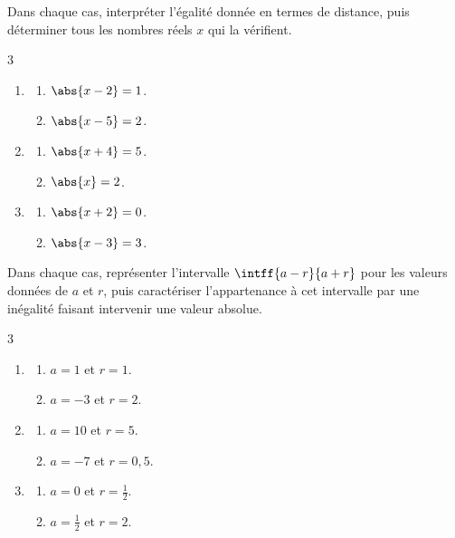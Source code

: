 \exo

Dans chaque cas, interpréter l'égalité donnée en termes de distance, puis déterminer tous les nombres réels $x$ qui la vérifient.

\vspace{-6pt}
\setlength{\columnsep}{1cm}
\setlength{\columnseprule}{0pt}
\begin{multicols}{3}
\begin{enumerate}
\item 
\begin{enumerate}
\item $\abs{x-2}=1$.

\medskip
\item $\abs{x-5}=2$.
\end{enumerate}
\item 
\begin{enumerate}
\item $\abs{x+4}=5$.

\medskip
\item $\abs{x}=2$.
\end{enumerate}
\item 
\begin{enumerate}
\item $\abs{x+2}=0$.

\medskip
\item $\abs{x-3}=3$.
\end{enumerate}
\end{enumerate}
\end{multicols}

\exo

Dans chaque cas, représenter l'intervalle $\intff{a-r}{a+r}$ pour les valeurs données de $a$ et $r$, puis caractériser l'appartenance à cet intervalle par une inégalité faisant intervenir une valeur absolue.

\vspace{-6pt}
\setlength{\columnsep}{1cm}
\setlength{\columnseprule}{0pt}
\begin{multicols}{3}
\begin{enumerate}
\item 
\begin{enumerate}
\item $a=1$ et $r=1$.

\medskip
\item $a=-3$ et $r=2$.
\end{enumerate}
\item 
\begin{enumerate}
\item $a=10$ et $r=5$.

\medskip
\item $a=-7$ et $r=0,5$.
\end{enumerate}
\item 
\begin{enumerate}
\item $a=0$ et $r=\frac{1}{2}$.

\medskip
\item $a=\frac{1}{2}$ et $r=2$.
\end{enumerate}
\end{enumerate}
\end{multicols}

